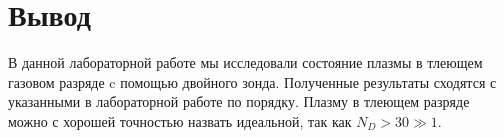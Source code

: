 \documentclass{lab}
\begin{document}
\section*{Вывод}
В данной лабораторной работе мы исследовали состояние плазмы в тлеющем газовом разряде c помощью двойного зонда. Полученные результаты сходятся с указанными в лабораторной работе по порядку. Плазму в тлеющем разряде можно с хорошей точностью назвать идеальной, так как $N_D > 30 \gg 1$.
\end{document}
